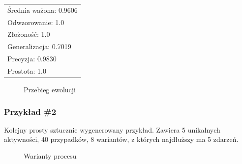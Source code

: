  \begin{center}
  \begin{tabular}{l}
	Średnia ważona: 0.9606 \\
	Odwzorowanie: 1.0 \\
	Złożoność: 1.0 \\
	Generalizacja: 0.7019 \\
	Precyzja: 0.9830 \\
	Prostota: 1.0
  \end{tabular}
 \end{center}
 
\begin{figure}[H]
	\caption{\label{fig:flow_chart}Przebieg ewolucji}
\end{figure}

\subsubsection{Przykład \#2}
Kolejny prosty sztucznie wygenerowany przykład. Zawiera 5 unikalnych aktywności, 40 przypadków, 8 wariantów, z których najdłuższy ma 5 zdarzeń. 

\begin{figure}[H]
	\caption{\label{fig:flow_chart}Warianty procesu}
\end{figure}

